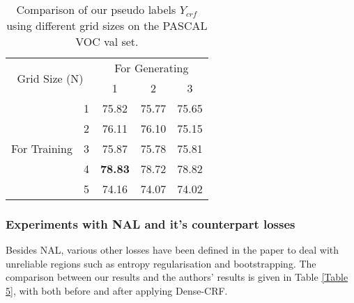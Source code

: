 \begin{table}[ht!]
\centering
\begin{tabular}{ccccc} 
\toprule\toprule
\multicolumn{2}{c}{\multirow{2}{*}{Grid Size (N)}} & \multicolumn{3}{c}{For Generating}  \\ 
\multicolumn{2}{c}{}                           & 1 & 2 & 3                            \\ 
\midrule
\multirow{5}{*}{{For Training}}         & 1      &75.82   &75.77   &75.65                              \\ 
                                        & 2      &76.11   &76.10   &75.15                              \\ 
                                        & 3      &75.87   &75.78   &75.81                              \\ 
                                        & 4      &\textbf{78.83}   &78.72   &78.82                              \\ 
                                        & 5      &74.16   &74.07   &74.02                              \\
\bottomrule
\end{tabular}
\vspace{1mm}
\caption{Comparison of our pseudo labels $Y_{crf}$ using different grid sizes on the PASCAL VOC val set.}
\label{tab:grid}
\end{table}

\subsubsection{Experiments with NAL and it's counterpart losses}
\label{sec:bootstraping}

Besides NAL, various other losses have been defined in the paper to deal with unreliable regions such as entropy regularisation and bootstrapping. The comparison between our results and the authors' results is given in Table \ref{Table 5}, with both before and after applying Dense-CRF.

